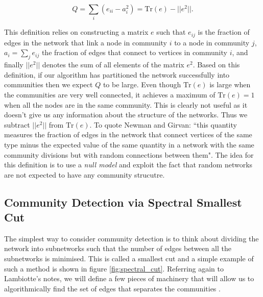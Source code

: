 $$ Q = \sum_i (e_{ii} - a_i^2) = \text{Tr}(e) - ||e^2||. $$

This definition relies on constructing a matrix $e$ such that $e_{ij}$ is the fraction of edges in the network that link a node in community $i$ to a node in community $j$, $a_i = \sum_j e_{ij}$ the fraction of edges that connect to vertices in community $i$, and finally $||e^2||$ denotes the sum of all elements of the matrix $e^2$. Based on this definition, if our algorithm has partitioned the network successfully into communities then we expect $Q$ to be large. Even though $\text{Tr}(e)$ is large when the communities are very well connected, it achieves a maximum of $\text{Tr}(e) = 1$ when all the nodes are in the same community. This is clearly not useful as it doesn't give us any information about the structure of the networks. Thus we subtract $||e^2||$ from $\text{Tr}(e)$. To quote Newman and Girvan: ``this quantity measures the fraction of edges in the network that connect vertices of the same type minus the expected value of the same quantity in a network with the same community divisions but with random connections between them". The idea for this definition is to use a \emph{null model} and exploit the fact that random networks are not expected to have any community strucutre.




\subsection{Community Detection via Spectral Smallest Cut}\label{sec:smallest_cut}
The simplest way to consider community detection is to think about dividing the network into subnetworks such that the number of edges between all the subnetworks is minimised. This is called a smallest cut and a simple example of such a method is shown in figure \ref{fig:spectral_cut}. Referring again to Lambiotte's notes, we will define a few pieces of machinery that will allow us to algorithmically find the set of edges that separates the communities \cite[26-27]{oxford:renaud_notes}. 

